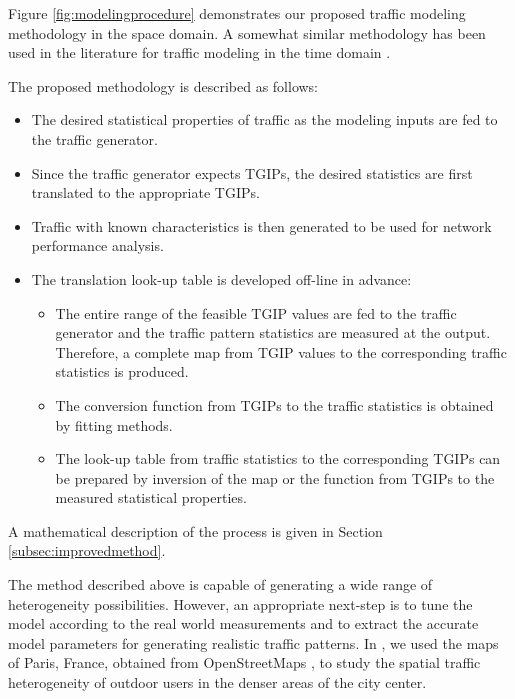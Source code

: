 \documentclass[journal]{IEEEtran}
\begin{document}
Figure \ref{fig:modelingprocedure} demonstrates our proposed traffic modeling methodology in the space domain. A somewhat similar methodology has been used in the literature for traffic modeling in the time domain \cite{xie2012modeling}.

The proposed methodology is described as follows:
\begin{itemize}
\item The desired statistical properties of traffic as the modeling inputs are fed to the traffic generator.
\item Since the traffic generator expects TGIPs, the desired statistics are first translated to the appropriate TGIPs. \item Traffic with known characteristics is then generated to be used for network performance analysis.
\item The translation look-up table is developed off-line in advance:
\begin{itemize}
\item The entire range of the feasible TGIP values are fed to the traffic generator and the traffic pattern statistics are measured at the output. Therefore, a complete map from TGIP values to the corresponding traffic statistics is produced.
\item The conversion function from TGIPs to the traffic statistics is obtained by fitting methods.
\item The look-up table from traffic statistics to the corresponding TGIPs can be prepared by inversion of the map or the function from TGIPs to the measured statistical properties.
\end{itemize}
\end{itemize}
A mathematical description of the process is given in Section \ref{subsec:improvedmethod}.

The method described above is capable of generating a wide range of heterogeneity possibilities. However, an appropriate next-step is to tune the model according to the real world measurements and to extract the accurate model parameters for generating realistic traffic patterns. In \cite{meisammap2015}, we used the maps of Paris, France, obtained from OpenStreetMaps \cite{OSMorg}, to study the spatial traffic heterogeneity of outdoor users in the denser areas of the city center.
\end{document}
